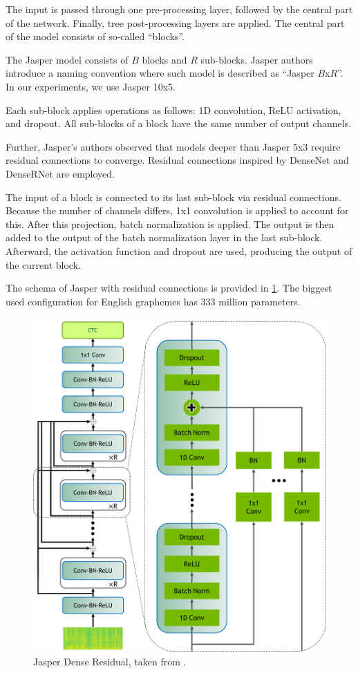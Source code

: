 The input is passed through one pre-processing layer, followed by the central part of the network. Finally, tree post-processing layers are applied. The central part of the model consists of so-called ``blocks''.

The Jasper model consists of $B$ blocks and $R$ sub-blocks. Jasper authors introduce a naming convention where such model is described as ``Jasper $B$x$R$''. In our experiments, we use Jasper 10x5.

Each sub-block applies operations as follows: 1D convolution, ReLU activation, and dropout. All sub-blocks of a block have the same number of output channels. 

Further, Jasper's authors observed that models deeper than Jasper 5x3 require residual connections to converge. Residual connections inspired by DenseNet  and DenseRNet  are employed.

The input of a block is connected to its last sub-block via residual connections. Because the number of channels differs, 1x1 convolution is applied to account for this. After this projection, batch normalization is applied. The output is then added to the output of the batch normalization layer in the last sub-block. Afterward, the activation function and dropout are used, producing the output of the current block.

The schema of Jasper with residual connections is provided in \cref{fig:jasper_dr}. The biggest used configuration for English graphemes has 333 million parameters.

\begin{figure}[]
	\centering
	\includegraphics[width=0.9\linewidth]{img/JasperVerticalDR4.png}
	\caption{Jasper Dense Residual, taken from .}
	\label{fig:jasper_dr}
\end{figure}

